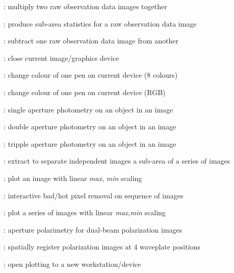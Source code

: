 \begin{description}
\item []: multiply two raw observation data
images together

\item []: produce sub-area statistics for a raw
observation data image

\item []: subtract one raw observation data image
from another

\item []: close current image/graphics device

\item []: change colour of one pen on current
device (8 colours)

\item []: change colour of one pen on current
device (RGB)

\item []: single aperture photometry on an object in
an image

\item []: double aperture photometry on an object
in an image

\item []: tripple aperture photometry on an object
in an image

\item []: extract to separate independent
images a sub-area of a series of images

\item []: plot an image with linear {\it max},{\it
min} scaling

\item []: interactive bad/hot pixel
removal on sequence of images

\item []: plot a series of images with linear
{\it max},{\it min} scaling

\item []: aperture polarimetry for dual-beam
polarization images

\item []: spatially register polarization
images at 4 waveplate positions

\item []: open plotting to a new
workstation/device


\end{description}
